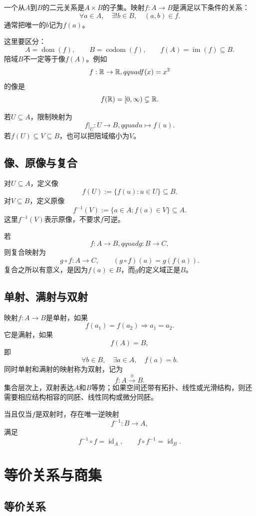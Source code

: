 一个从$A$到$B$的二元关系是$A\times B$的子集。映射$f:A\to B$是满足以下条件的关系：
\[
    \forall a\in A,\quad
    \exists!b\in B,\quad (a,b)\in f.
\]
通常把唯一的$b$记为$f(a)$。

这里要区分：
\[
    A=\operatorname{dom}(f),
    \qquad
    B=\operatorname{codom}(f),
    \qquad
    f(A)=\operatorname{im}(f)\subseteq B.
\]
陪域$B$不一定等于像$f(A)$。例如
\[
    f:\mathbb{R}\to\mathbb{R},qquad f(x)=x^2
\]
的像是
\[
    f(\mathbb{R})=[0,\infty)\subsetneq\mathbb{R}.
\]

若$U\subseteq A$，限制映射为
\[
    f|_U:U\to B,qquad u\mapsto f(u).
\]
若$f(U)\subseteq V\subseteq B$，也可以把陪域缩小为$V$。

\subsection{像、原像与复合}

对$U\subseteq A$，定义像
\[
    f(U):=\{f(u):u\in U\}\subseteq B.
\]
对$V\subseteq B$，定义原像
\[
    f^{-1}(V):=\{a\in A:f(a)\in V\}\subseteq A.
\]
这里$f^{-1}(V)$表示原像，不要求$f$可逆。

若
\[
    f:A\to B,qquad g:B\to C,
\]
则复合映射为
\[
    g\circ f:A\to C,
    \qquad
    (g\circ f)(a)=g(f(a)).
\]
复合之所以有意义，是因为$f(a)\in B$，而$g$的定义域正是$B$。

\subsection{单射、满射与双射}

映射$f:A\to B$是单射，如果
\[
    f(a_1)=f(a_2)\Rightarrow a_1=a_2.
\]
它是满射，如果
\[
    f(A)=B,
\]
即
\[
    \forall b\in B,\quad\exists a\in A,\quad f(a)=b.
\]
同时单射和满射的映射称为双射，记为
\[
    f:A\xrightarrow{\cong}B.
\]
集合层次上，双射表达$A$和$B$等势；如果空间还带有拓扑、线性或光滑结构，则还需要相应结构相容的同胚、线性同构或微分同胚。

当且仅当$f$是双射时，存在唯一逆映射
\[
    f^{-1}:B\to A,
\]
满足
\[
    f^{-1}\circ f=\operatorname{id}_A,
    \qquad
    f\circ f^{-1}=\operatorname{id}_B.
\]


\section{等价关系与商集}

\subsection{等价关系}

